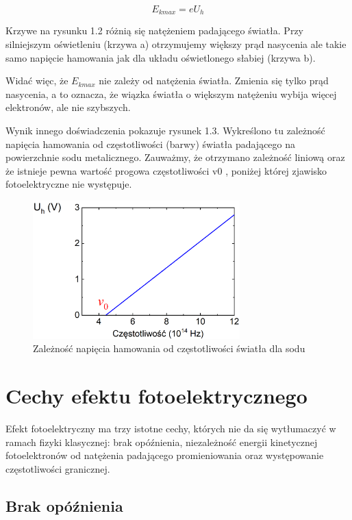 \documentclass[12pt, a4paper, notitlepage]{report}
\begin{document}
	\begin{equation}
		E_{kmax}=eU_{h}
	\end{equation}

	Krzywe na rysunku 1.2 różnią się natężeniem padającego światła. Przy silniejszym
	oświetleniu {\color{red}(krzywa a)} otrzymujemy większy prąd nasycenia ale takie
	samo napięcie hamowania jak dla układu oświetlonego słabiej {\color{blue}(krzywa b)}.

	Widać więc, że $E_{kmax}$ nie zależy od natężenia światła. Zmienia się tylko prąd
	nasycenia, a to oznacza, że wiązka światła o większym natężeniu wybija więcej elektronów,
	ale nie szybszych.

	Wynik innego doświadczenia pokazuje rysunek 1.3. Wykreślono tu zależność napięcia
	hamowania od częstotliwości (barwy) światła padającego na powierzchnie sodu metalicznego.
	Zauważmy, że otrzymano zależność liniową oraz że istnieje pewna wartość progowa
	częstotliwości v0 , poniżej której zjawisko fotoelektryczne nie występuje.

	\begin{figure}[htp]
		\centering
		\includegraphics[width=8cm]{img/rysunek_1.3.png}
		\caption{Zależność napięcia hamowania od częstotliwości światła dla sodu}
		\label{fig:3}
	\end{figure}

	\section{Cechy efektu fotoelektrycznego}

	Efekt fotoelektryczny ma trzy istotne cechy, których nie da się wytłumaczyć w
	ramach fizyki klasycznej: brak opóźnienia, niezależność energii kinetycznej
	fotoelektronów od natężenia padającego promieniowania oraz występowanie
	częstotliwości granicznej.

	\subsection{Brak opóźnienia}
\end{document}

